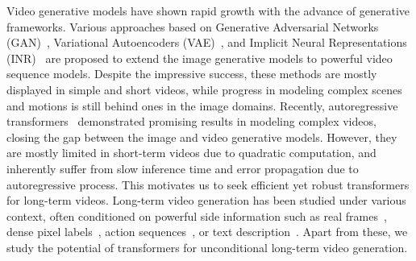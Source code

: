 \documentclass[10pt,twocolumn,letterpaper]{article}
\newcommand{\cutparagraphup}{\vspace*{-0.1in}}
\begin{document}
Video generative models have shown rapid growth with the advance of generative frameworks.
Various approaches based on Generative Adversarial Networks (GAN)~\cite{DVDGAN,TGAN,TGANv2,MoCoGAN,MoCoGAN-HD,LDVDGAN}, Variational Autoencoders (VAE)~\cite{SVG, SAVP, FitVid, CWVAE, SRVP}, and Implicit Neural Representations (INR)~\cite{StyleGAN-V, DIGAN} are proposed to extend the image generative models to powerful video sequence models.
Despite the impressive success, these methods are mostly displayed in simple and short videos, while progress in modeling complex scenes and motions is still behind ones in the image domains.
Recently, autoregressive transformers~\cite{LVT, videoGPT, TATS, NUWA, CogVideo} demonstrated promising results in modeling complex videos, closing the gap between the image and video generative models.
However, they are mostly limited in short-term videos due to quadratic computation, and inherently suffer from slow inference time and error propagation due to autoregressive process.
This motivates us to seek efficient yet robust transformers for long-term videos.
Long-term video generation has been studied under various context, often conditioned on powerful side information such as real frames~\cite{CWVAE, SRVP, FitVid, LeeKCKR21, GHVAE, ImprovedVRNN}, dense pixel labels~\cite{HVP, Akan2022, LiangLDX17}, action sequences~\cite{Villegas2017, KimNCK19}, or text description~\cite{CogVideo,NUWA}.
Apart from these, we study the potential of transformers for unconditional long-term video generation.  
\cutparagraphup
\vspace{-0.2in}
\end{document}
